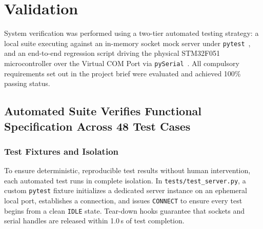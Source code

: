 \section{Validation}
\label{sec:valid}


System verification was performed using a two-tier automated testing strategy: a local suite executing against an in-memory socket mock server under \texttt{pytest}~\cite{pytest}, and an end-to-end regression script driving the physical STM32F051 microcontroller over the Virtual COM Port via \texttt{pySerial}~\cite{pyserial}.
All compulsory requirements set out in the project brief were evaluated and achieved 100\% passing status.

\subsection{Automated Suite Verifies Functional Specification Across 48 Test Cases}

\subsubsection{Test Fixtures and Isolation}
To ensure deterministic, reproducible test results without human intervention, each automated test runs in complete isolation.
In \texttt{tests/test\_server.py}, a custom \texttt{pytest} fixture initializes a dedicated server instance on an ephemeral local port, establishes a connection, and issues \texttt{CONNECT} to ensure every test begins from a clean \texttt{IDLE} state.
Tear-down hooks guarantee that sockets and serial handles are released within 1.0\,s of test completion.

